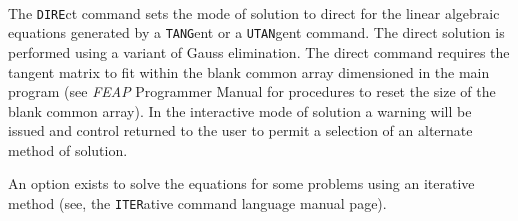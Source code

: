  \\{\smallskip}
\headb

The {\tt DIRE}ct command sets the mode of solution to direct
for the linear algebraic
equations generated by a {\tt TANG}ent or a {\tt UTAN}gent command.  The 
direct solution is performed using a variant of Gauss elimination.
The direct command requires the tangent matrix to fit
within the blank common array dimensioned in the main program (see
\textsl{FEAP}
Programmer Manual for procedures to reset the size of the blank common array).
In the interactive mode of solution a warning will be issued and control
returned to the user to permit a selection of an alternate method of solution.

An option exists to solve the equations for some problems using an iterative
method (see, the {\tt ITER}ative command language manual page).
\vfill\eject
